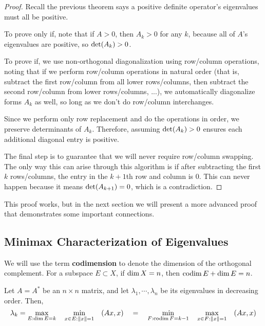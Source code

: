 \begin{proof}
Recall the previous theorem says a positive definite operator's eigenvalues must all be positive. 

To prove only if, note that if $A > 0$, then $A_{k} > 0$ for any $k$, because all of $A$'s eigenvalues are positive, so $\operatorname{det}(A_{k}) > 0$. 

To prove if, we use non-orthogonal diagonalization using row/column operations, noting that if we perform row/column operations in natural order (that is, subtract the first row/column from all lower rows/columns, then subtract the second row/column from lower rows/columns, ...), we automatically diagonalize forms $A_{k}$ as well, so long as we don't do row/column interchanges. 

Since we perform only row replacement and do the operations in order, we preserve determinants of $A_{k}$. Therefore, assuming $\operatorname{det}(A_{k}) > 0$ ensures each additional diagonal entry is positive. 

The final step is to guarantee that we will never require row/column swapping. The only way this can arise through this algorithm is if after subtracting the first $k$ rows/columns, the entry in the $k+1$th row and column is 0. This can never happen because it means $\operatorname{det}(A_{k+1}) = 0$, which is a contradiction. 
\end{proof}

This proof works, but in the next section we will present a more advanced proof that demonstrates some important connections. 

\subsection{Minimax Characterization of Eigenvalues}

We will use the term \textbf{codimension} to denote the dimension of the orthogonal complement. For a subspace $E \subset X$, if $\operatorname{dim} X = n$, then $\operatorname{codim} E + \operatorname{dim} E = n$. 

\begin{theorem}
Let $A = A^{*}$ be an $n \times n$ matrix, and let $\lambda_{1}, \cdots, \lambda_{n}$ be its eigenvalues in decreasing order. Then, 
$$\lambda_{k} = \max_{E: \operatorname{dim} E = k} \quad \min_{x \in E: \norm{x} = 1} \quad (Ax, x) \quad = \quad \min_{F: \operatorname{codim} F=k-1} \quad \max_{x \in F: \norm{x} = 1} \quad (Ax, x)$$

\end{theorem}

